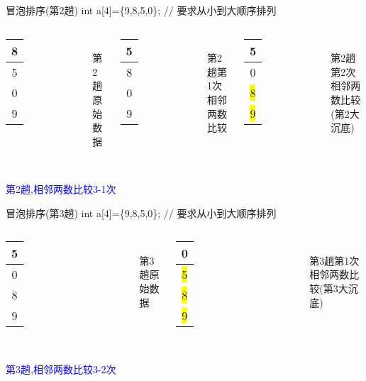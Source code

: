 \begin{frame}{冒泡排序(第2趟)}
int a[4]=\{9,8,5,0\}; // 要求从小到大顺序排列
\begin{columns}[T]
	\begin{tabular}{|c|}
		\hline 
		8 \\ 
		\hline 
		5 \\ 
		\hline 
		0 \\ 
		\hline
		9 \\
		\hline 
	\end{tabular}\\ 
	第2趟原始数据
	\pause
	\begin{tabular}{|c|}
		\hline 
		5 \\ 
		\hline 
		8 \\ 
		\hline 
		0 \\ 
		\hline
		9 \\
		\hline  
	\end{tabular}\\ 
	第2趟第1次相邻两数比较
	\pause
	\begin{tabular}{|c|}
		\hline 
		5 \\ 
		\hline 
		0 \\ 
		\hline 
		\colorbox{yellow}{8} \\ 
		\hline 
		\colorbox{yellow}{9} \\
		\hline 
	\end{tabular}\\ 
	第2趟第2次相邻两数比较(第2大沉底)
\end{columns}
~\\
\textcolor{blue}{第2趟,相邻两数比较3-1次}
\end{frame}

\begin{frame}{冒泡排序(第3趟)}
int a[4]=\{9,8,5,0\}; // 要求从小到大顺序排列
\begin{columns}[T]
	\begin{tabular}{|c|}
		\hline 
		5 \\ 
		\hline 
		0 \\ 
		\hline 
		8 \\ 
		\hline
		9 \\
		\hline 
	\end{tabular}\\ 
	第3趟原始数据
	\pause
	\begin{tabular}{|c|}
		\hline 
		0 \\ 
		\hline 
		\colorbox{yellow}{5} \\ 
		\hline 
		\colorbox{yellow}{8} \\ 
		\hline
		\colorbox{yellow}{9} \\
		\hline  
	\end{tabular}\\ 
	第3趟第1次相邻两数比较(第3大沉底)
\end{columns}
~\\
\textcolor{blue}{第3趟,相邻两数比较3-2次}
\end{frame}

